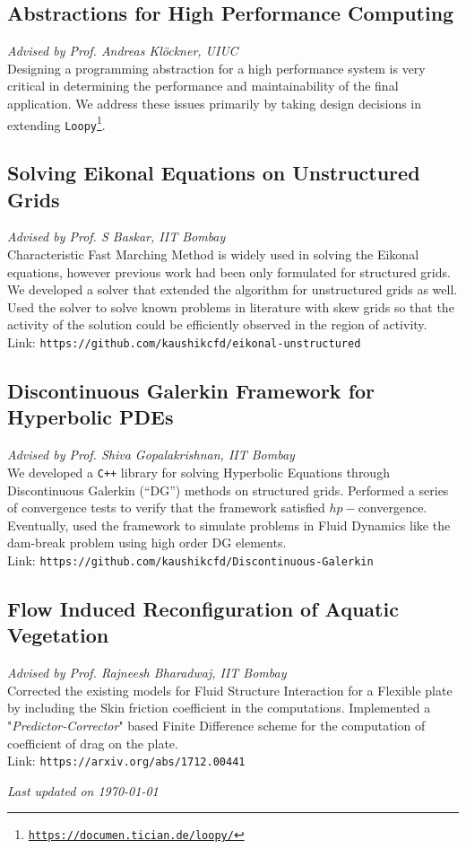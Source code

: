 \documentclass[letterpaper, 13pt]{article}
\newcommand{\updatenote}[1][\today]{\par\vfill{\scriptsize \textit{Last updated on #1}}}
\begin{document}
\subsection*{Abstractions for High Performance Computing}
\vspace{-1ex}
\small \textit{Advised by Prof. Andreas Kl\"{o}ckner, UIUC}\\
Designing a programming abstraction for a high performance system is very critical in determining the performance and maintainability of the final application. We address these issues primarily by taking design decisions in extending \texttt{Loopy}\footnote{\texttt{\url{https://documen.tician.de/loopy/}}}.

\subsection*{Solving Eikonal Equations on Unstructured Grids}
\vspace{-1ex}
\small \textit{Advised by Prof. S Baskar, IIT Bombay}\\
Characteristic Fast Marching Method is widely used in solving the Eikonal
equations, however previous work had been only formulated for structured
grids. We developed a solver that extended the algorithm for
unstructured grids as well. Used the solver to solve known problems in
literature with skew grids so that the activity of the solution could be
efficiently observed in the region of activity.\\
Link: \texttt{https://github.com/kaushikcfd/eikonal-unstructured}


\subsection*{Discontinuous Galerkin Framework for Hyperbolic PDEs}
\vspace{-1ex}
\small \textit{Advised by Prof. Shiva Gopalakrishnan, IIT Bombay}\\
We developed a \texttt{C++} library for solving Hyperbolic Equations through
Discontinuous Galerkin (``DG'') methods on structured grids.  Performed a series
of convergence tests to verify that the framework satisfied $hp-$convergence.
Eventually, used the framework to simulate problems in Fluid Dynamics like
the dam-break problem using high order DG elements.\\
Link: \texttt{https://github.com/kaushikcfd/Discontinuous-Galerkin}


\subsection*{Flow Induced Reconfiguration of Aquatic Vegetation}
\vspace{-1ex}
\small \textit{Advised by Prof. Rajneesh Bharadwaj, IIT Bombay}\\
Corrected the existing models for Fluid Structure Interaction for a Flexible plate by including the Skin friction coefficient in the computations. Implemented a "\textit{Predictor-Corrector}" based Finite Difference scheme for the computation of coefficient of drag on the plate.\\
Link: \texttt{https://arxiv.org/abs/1712.00441}


\updatenote
\end{document}
